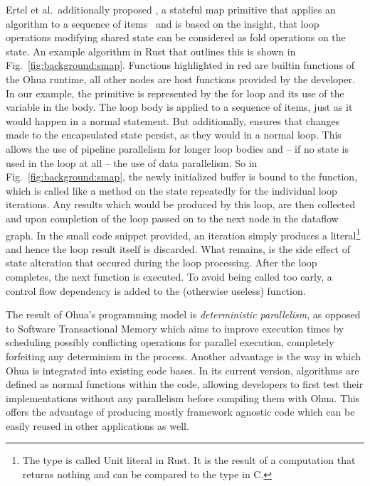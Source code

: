 Ertel et al.\ additionally proposed , a stateful map primitive that applies an algorithm to a sequence of items~\cite{ertel2019stclang} and is based on the insight, that loop operations modifying shared state can be considered as fold operations on the state.
An example algorithm in Rust that outlines this is shown in Fig.~\ref{fig:background:smap}.
Functions highlighted in red are builtin functions of the Ohua runtime, all other nodes are host functions provided by the developer.
In our example, the  primitive is represented by the for loop and its use of the  variable in the body.
The loop body is applied to a sequence of items, just as it would happen in a normal  statement.
But additionally,  ensures that changes made to the encapsulated state persist, as they would in a normal  loop.
This allows the use of pipeline parallelism for longer loop bodies and -- if no state is used in the loop at all -- the use of data parallelism.
So in Fig.~\ref{fig:background:smap}, the newly initialized buffer is bound to the  function, which is called like a method on the state repeatedly for the individual loop iterations.
Any results which would be produced by this loop, are then collected and upon completion of the loop passed on to the next node in the dataflow graph.
In the small code snippet provided, an iteration simply produces a \rust{()} literal\footnote{The \rust{()} type is called Unit literal in Rust. It is the result of a computation that returns nothing and can be compared to the  type in C.} and hence the loop result itself is discarded.
What remains, is the side effect of state alteration that occured during the loop processing.
After the loop completes, the next function is executed.
To avoid  being called too early, a control flow dependency is added to the (otherwise useless)  function.

The result of Ohua's programming model is \emph{deterministic parallelism}, as opposed to Software Transactional Memory which aims to improve execution times by scheduling possibly conflicting operations for parallel execution, completely forfeiting any determinism in the process.
Another advantage is the way in which Ohua is integrated into existing code bases.
In its current version, algorithms are defined as normal functions within the code, allowing developers to first test their implementations without any parallelism before compiling them with Ohua.
This offers the advantage of producing mostly framework agnostic code which can be easily reused in other applications as well.


